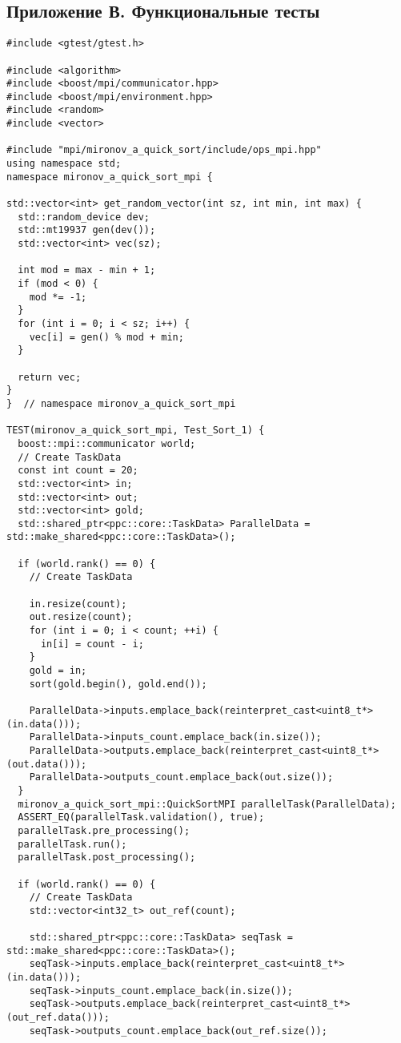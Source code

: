 \documentclass[12pt]{article}
\begin{document}
\subsection*{Приложение В. Функциональные тесты}
\begin{lstlisting}
#include <gtest/gtest.h>

#include <algorithm>
#include <boost/mpi/communicator.hpp>
#include <boost/mpi/environment.hpp>
#include <random>
#include <vector>

#include "mpi/mironov_a_quick_sort/include/ops_mpi.hpp"
using namespace std;
namespace mironov_a_quick_sort_mpi {

std::vector<int> get_random_vector(int sz, int min, int max) {
  std::random_device dev;
  std::mt19937 gen(dev());
  std::vector<int> vec(sz);

  int mod = max - min + 1;
  if (mod < 0) {
    mod *= -1;
  }
  for (int i = 0; i < sz; i++) {
    vec[i] = gen() % mod + min;
  }

  return vec;
}
}  // namespace mironov_a_quick_sort_mpi

TEST(mironov_a_quick_sort_mpi, Test_Sort_1) {
  boost::mpi::communicator world;
  // Create TaskData
  const int count = 20;
  std::vector<int> in;
  std::vector<int> out;
  std::vector<int> gold;
  std::shared_ptr<ppc::core::TaskData> ParallelData = std::make_shared<ppc::core::TaskData>();

  if (world.rank() == 0) {
    // Create TaskData

    in.resize(count);
    out.resize(count);
    for (int i = 0; i < count; ++i) {
      in[i] = count - i;
    }
    gold = in;
    sort(gold.begin(), gold.end());

    ParallelData->inputs.emplace_back(reinterpret_cast<uint8_t*>(in.data()));
    ParallelData->inputs_count.emplace_back(in.size());
    ParallelData->outputs.emplace_back(reinterpret_cast<uint8_t*>(out.data()));
    ParallelData->outputs_count.emplace_back(out.size());
  }
  mironov_a_quick_sort_mpi::QuickSortMPI parallelTask(ParallelData);
  ASSERT_EQ(parallelTask.validation(), true);
  parallelTask.pre_processing();
  parallelTask.run();
  parallelTask.post_processing();

  if (world.rank() == 0) {
    // Create TaskData
    std::vector<int32_t> out_ref(count);

    std::shared_ptr<ppc::core::TaskData> seqTask = std::make_shared<ppc::core::TaskData>();
    seqTask->inputs.emplace_back(reinterpret_cast<uint8_t*>(in.data()));
    seqTask->inputs_count.emplace_back(in.size());
    seqTask->outputs.emplace_back(reinterpret_cast<uint8_t*>(out_ref.data()));
    seqTask->outputs_count.emplace_back(out_ref.size());


\end{lstlisting}
\end{document}
